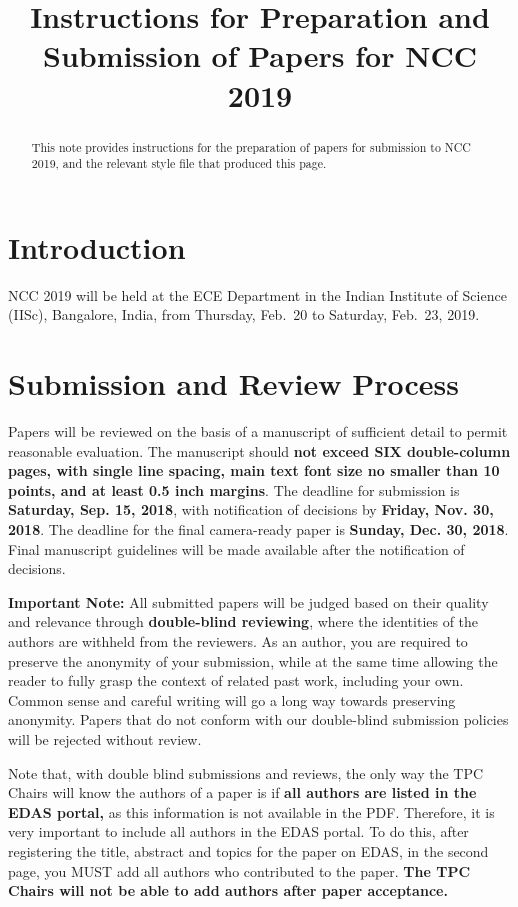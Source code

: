 \documentclass[10pt,conference]{IEEEtran}
\begin{document}
\title{Instructions for Preparation and Submission of Papers for NCC 2019}

\maketitle

\begin{abstract}
This note provides instructions for the preparation of papers
for submission to NCC 2019, and the relevant style file that produced
this page.
\end{abstract}

\section{Introduction}
NCC 2019 will be held at the ECE Department in the 
Indian Institute of Science (IISc), Bangalore, India, from Thursday, Feb.~20 to
Saturday, Feb.~23, 2019.



\section{Submission and Review Process}
Papers will be reviewed on the basis of a manuscript of sufficient
detail to permit reasonable evaluation. The manuscript should {\bf
not exceed {\bf SIX} double-column pages, with single line spacing, main
text font size no smaller than 10 points, and at least 0.5 inch
margins}. The deadline for submission is {\bf Saturday, Sep. 15, 2018}, with notification of decisions by {\bf Friday, Nov. 30, 2018}. The deadline for the final camera-ready paper is {\bf Sunday, Dec. 30, 2018}. 
Final manuscript guidelines will be made available after the notification of decisions.


{\bf{Important Note:}} 
All submitted papers will be judged based on their quality and relevance through {\bf double-blind reviewing}, where the identities of the authors are withheld from the reviewers. As an author, you are required to preserve the anonymity of your submission, while at the same time allowing the reader to fully grasp the context of related past work, including your own. Common sense and careful writing will go a long way towards preserving anonymity. Papers that do not conform with our double-blind submission policies will be rejected without review.

Note that, with double blind submissions and reviews, the only way the TPC Chairs will know the authors of a paper is if {\bf all authors are listed in the EDAS portal,} as this information is not available in the PDF. Therefore, it is very important to include all authors in the EDAS portal. To do this, after registering the title, abstract and topics for the paper on EDAS, in the second page, you MUST add all authors who contributed to the paper. {\bf The TPC Chairs will not be able to add authors after paper acceptance.} 
\end{document}
